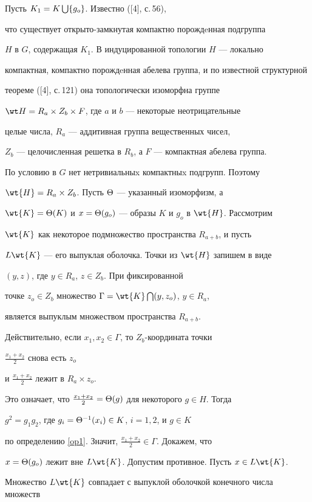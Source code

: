 \begin{pf}


Пусть $K_1=K\bigcup\{g_o\}$. Известно ([4], с.\,56),


что существует открыто-замкнутая компактно порождeнная подгруппа


$H$ в $G$, содержащая $K_1$. В индуцированной топологии $H$ --- локально 


компактная, компактно порождeнная абелева группа, и по известной структурной 


теореме ([4], с.\,121) она топологически изоморфна группе 


$\wt H=R_a\ti Z_b\ti F$, где $a$ и $b$ --- некоторые неотрицательные 


целые числа, $R_a$ --- аддитивная группа вещественных чисел, 


$Z_b$ --- целочисленная решетка в $R_b$, а $F$ --- компактная абелева группа.


По условию в $G$ нет нетривиальныx компактныx подгрупп. Поэтому


$\wt{H}=R_a\ti Z_b$. Пусть $\Theta$ --- указанный изоморфизм, а


$\wt{K}=\th(K)$ и $x=\Theta(g_o)$ --- образы $K$ и $g_o$ в $\wt{H}$. Рассмотрим 


$\wt{K}$ как некоторое подмножество пространства $R_{a+b}$, и пусть


$L\wt{K}$ --- его выпуклая оболочка. Точки из $\wt{H}$ запишем в виде


$(y,z)$, где $y\in R_a$, $z\in Z_b$. При фиксированной


точке $z_o\in Z_b$ множество $\Gamma=\wt{K}\bca(y,z_o)$, $y\in R_a$,


является выпуклым множеством пространства $R_{a+b}$. 


Действительно, если $x_1,x_2\in\Gamma$, то $Z_b$-координата точки


$\frac{x_1+x_2}{2}$ снова есть $z_o$


и $\frac{x_1+x_2}{2}$ лежит в $R_a\times z_o$.


Это означает, что $\frac{x_1+x_2}{2}=\Theta(g)$ для некоторого $g\in H$. Тогда 


$g^2=g_1g_2$, где $g_i=\Theta^{-1}(x_i)\in K$, $i=1,2$, и $g\in K$


по определению \ref{op1}. Значит, $\frac{x_1+x_2}{2}\in\Gamma$. Докажем, что 


$x=\Theta(g_o)$ лежит вне $L\wt{K}$. Допустим противное. Пусть $x\in L\wt{K}$. 


Множество $L\wt{K}$ совпадает с выпуклой оболочкой конечного числа множеств 



\end{pf}
